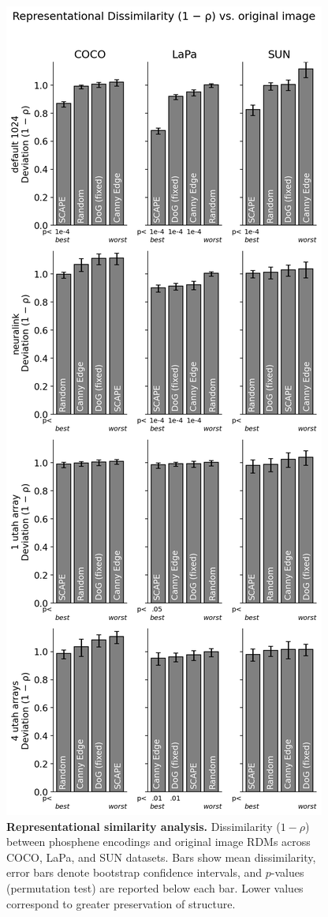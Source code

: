 \begin{figure}[h!]
    \centering
    \includegraphics[width=0.9\columnwidth]{figures/RSA.png}
    \caption{\textbf{Representational similarity analysis.} 
    Dissimilarity ($1-\rho$) between phosphene encodings and original image RDMs across COCO, LaPa, and SUN datasets. 
    Bars show mean dissimilarity, error bars denote bootstrap confidence intervals, and $p$-values (permutation test) are reported below each bar. 
    Lower values correspond to greater preservation of structure.}
    \label{fig:rsa_pixel}
\end{figure}


